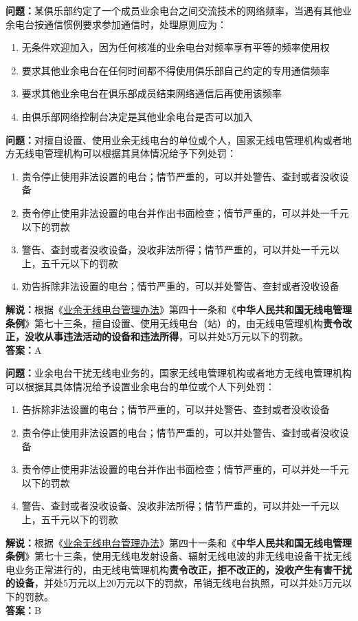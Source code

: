 \textbf{问题：}某俱乐部约定了一个成员业余电台之间交流技术的网络频率，当遇有其他业余电台按通信惯例要求参加通信时，处理原则应为：
\begin{enumerate}[label=\Alph*), leftmargin=1.5cm]
	\item 无条件欢迎加入，因为任何核准的业余电台对频率享有平等的频率使用权
	\item 要求其他业余电台在任何时间都不得使用俱乐部自己约定的专用通信频率
	\item 要求其他业余电台在俱乐部成员结束网络通信后再使用该频率
	\item 由俱乐部网络控制台决定是其他业余电台是否可以加入
\end{enumerate}


\textbf{问题：}对擅自设置、使用业余无线电台的单位或个人，国家无线电管理机构或者地方无线电管理机构可以根据其具体情况给予下列处罚：
\begin{enumerate}[label=\Alph*), leftmargin=1.5cm]
	\item  责令停止使用非法设置的电台；情节严重的，可以并处警告、查封或者没收设备
	\item  责令停止使用非法设置的电台并作出书面检查；情节严重的，可以并处一千元以下的罚款
	\item  警告、查封或者没收设备，没收非法所得；情节严重的，可以并处一千元以上，五千元以下的罚款
	\item  劝告拆除非法设置的电台；情节严重的，可以并处警告、查封或者没收设备
\end{enumerate}
\textbf{解说：}根据《\href{https://www.miit.gov.cn/jgsj/zfs/bmgz/art/2020/art_147b69815b3641caad9047735f94c860.html}{业余无线电台管理办法}》第四十一条和《\textbf{中华人民共和国无线电管理条例}》第七十三条，擅自设置、使用无线电台（站）的，由无线电管理机构\textbf{责令改正，没收从事违法活动的设备和违法所得}，可以并处5万元以下的罚款。\\
\textbf{答案：}A


\textbf{问题：}业余电台干扰无线电业务的，国家无线电管理机构或者地方无线电管理机构可以根据其具体情况给予设置业余电台的单位或个人下列处罚：
\begin{enumerate}[label=\Alph*), leftmargin=1.5cm]
	\item  告拆除非法设置的电台；情节严重的，可以并处警告、查封或者没收设备
	\item  责令停止使用非法设置的电台；情节严重的，可以并处警告、查封或者没收设备
	\item  责令停止使用非法设置的电台并作出书面检查；情节严重的，可以并处一千元以下的罚款
	\item  警告、查封或者没收设备、没收非法所得；情节严重的，可以并处一千元以上，五千元以下的罚款
\end{enumerate}
\textbf{解说：}根据《\href{https://www.miit.gov.cn/jgsj/zfs/bmgz/art/2020/art_147b69815b3641caad9047735f94c860.html}{业余无线电台管理办法}》第四十一条和《\textbf{中华人民共和国无线电管理条例}》第七十三条，使用无线电发射设备、辐射无线电波的非无线电设备干扰无线电业务正常进行的，由无线电管理机构\textbf{责令改正，拒不改正的，没收产生有害干扰的设备}，并处5万元以上20万元以下的罚款，吊销无线电台执照，可以并处5万元以下的罚款。\\
\textbf{答案：}B


